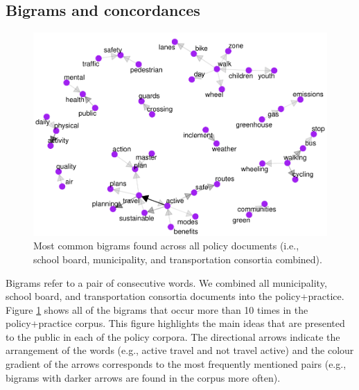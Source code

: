 \documentclass[preprint, 3p,
authoryear]{elsarticle} %
\begin{document}
\hypertarget{bigrams-and-concordances}{%
\subsection{Bigrams and concordances}\label{bigrams-and-concordances}}

\begin{figure}

{\centering \includegraphics[width=1\linewidth]{AST-Framing-Ontario_files/figure-latex/policy-visual-1} 

}

\caption{\label{fig:policy-visual}Most common bigrams found across all policy documents (i.e., school board, municipality, and transportation consortia combined).}\label{fig:policy-visual}
\end{figure}

Bigrams refer to a pair of consecutive words. We combined all
municipality, school board, and transportation consortia documents into
the policy+practice. Figure \ref{fig:policy-visual} shows all of the
bigrams that occur more than 10 times in the policy+practice corpus.
This figure highlights the main ideas that are presented to the public
in each of the policy corpora. The directional arrows indicate the
arrangement of the words (e.g., active travel and not travel active) and
the colour gradient of the arrows corresponds to the most frequently
mentioned pairs (e.g., bigrams with darker arrows are found in the
corpus more often).
\end{document}
